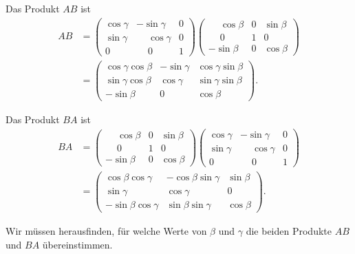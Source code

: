 \begin{loesung}
\begin{teilaufgaben}
\item Das Produkt $AB$ ist
\begin{align*}
AB
&=
\begin{pmatrix}
\cos\gamma&         - \sin\gamma&0\\
\sin\gamma&\phantom{-}\cos\gamma&0\\
    0     &\phantom{-}    0     &1
\end{pmatrix}
\begin{pmatrix}
\phantom{-}\cos\beta&0&\sin\beta\\
\phantom{-}    0    &1&    0    \\
         - \sin\beta&0&\cos\beta
\end{pmatrix}
\\
&=
\begin{pmatrix}
\cos\gamma\cos\beta&-\sin\gamma&\cos\gamma\sin\beta\\
\sin\gamma\cos\beta& \cos\gamma&\sin\gamma\sin\beta\\
         -\sin\beta&     0     &          \cos\beta
\end{pmatrix}.
\end{align*}
\item Das Produkt $BA$ ist
\begin{align*}
BA
&=
\begin{pmatrix}
\phantom{-}\cos\beta&0&\sin\beta\\
\phantom{-}    0    &1&    0    \\
         - \sin\beta&0&\cos\beta
\end{pmatrix}
\begin{pmatrix}
\cos\gamma&         - \sin\gamma&0\\
\sin\gamma&\phantom{-}\cos\gamma&0\\
    0     &\phantom{-}    0     &1
\end{pmatrix}
\\
&=
\begin{pmatrix}
 \cos\beta\cos\gamma&-\cos\beta\sin\gamma&\sin\beta\\
          \sin\gamma&          \cos\gamma&     0   \\
-\sin\beta\cos\gamma& \sin\beta\sin\gamma&\cos\beta
\end{pmatrix}.
\end{align*}
\item
Wir müssen herausfinden, für welche Werte von $\beta$ und $\gamma$ die
beiden Produkte $AB$ und $BA$ übereinstimmen.

\end{teilaufgaben}
\end{loesung}
